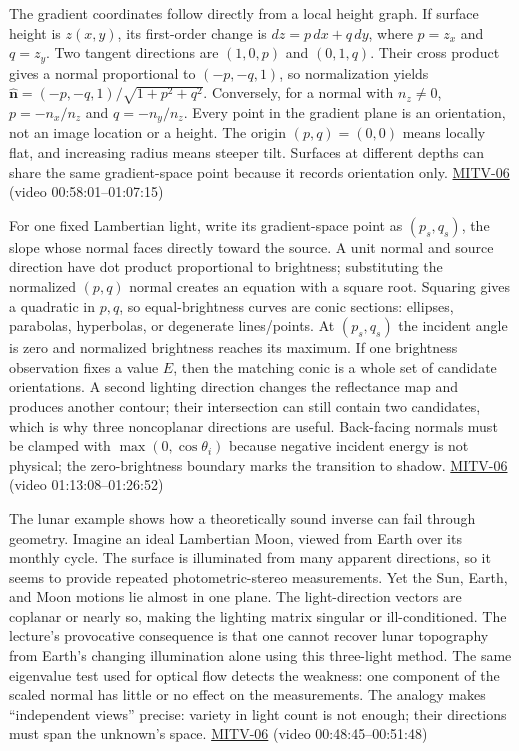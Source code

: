 The gradient coordinates follow directly from a local height graph. If surface height is \(z(x,y)\), its first-order change is \(dz=p\,dx+q\,dy\), where \(p=z_x\) and \(q=z_y\). Two tangent directions are \((1,0,p)\) and \((0,1,q)\). Their cross product gives a normal proportional to \((-p,-q,1)\), so normalization yields \(\hat{\mathbf n}=(-p,-q,1)/\sqrt{1+p^2+q^2}\). Conversely, for a normal with \(n_z\ne0\), \(p=-n_x/n_z\) and \(q=-n_y/n_z\). Every point in the gradient plane is an orientation, not an image location or a height. The origin \((p,q)=(0,0)\) means locally flat, and increasing radius means steeper tilt. Surfaces at different depths can share the same gradient-space point because it records orientation only. \hyperref[04-visual-computing-ii-ch036]{MITV-06} (video 00:58:01--01:07:15)

For one fixed Lambertian light, write its gradient-space point as \((p_s,q_s)\), the slope whose normal faces directly toward the source. A unit normal and source direction have dot product proportional to brightness; substituting the normalized \((p,q)\) normal creates an equation with a square root. Squaring gives a quadratic in \(p,q\), so equal-brightness curves are conic sections: ellipses, parabolas, hyperbolas, or degenerate lines/points. At \((p_s,q_s)\) the incident angle is zero and normalized brightness reaches its maximum. If one brightness observation fixes a value \(E\), then the matching conic is a whole set of candidate orientations. A second lighting direction changes the reflectance map and produces another contour; their intersection can still contain two candidates, which is why three noncoplanar directions are useful. Back-facing normals must be clamped with \(\max(0,\cos\theta_i)\) because negative incident energy is not physical; the zero-brightness boundary marks the transition to shadow. \hyperref[04-visual-computing-ii-ch036]{MITV-06} (video 01:13:08--01:26:52)

The lunar example shows how a theoretically sound inverse can fail through geometry. Imagine an ideal Lambertian Moon, viewed from Earth over its monthly cycle. The surface is illuminated from many apparent directions, so it seems to provide repeated photometric-stereo measurements. Yet the Sun, Earth, and Moon motions lie almost in one plane. The light-direction vectors are coplanar or nearly so, making the lighting matrix singular or ill-conditioned. The lecture's provocative consequence is that one cannot recover lunar topography from Earth's changing illumination alone using this three-light method. The same eigenvalue test used for optical flow detects the weakness: one component of the scaled normal has little or no effect on the measurements. The analogy makes ``independent views'' precise: variety in light count is not enough; their directions must span the unknown's space. \hyperref[04-visual-computing-ii-ch036]{MITV-06} (video 00:48:45--00:51:48)

